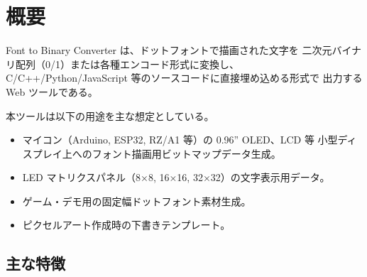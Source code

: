 \section{概要}

Font to Binary Converter は、ドットフォントで描画された文字を
二次元バイナリ配列（0/1）または各種エンコード形式に変換し、
C/C++/Python/JavaScript 等のソースコードに直接埋め込める形式で
出力する Web ツールである。

本ツールは以下の用途を主な想定としている。

\begin{itemize}[leftmargin=*,itemsep=2pt]
  \item マイコン（Arduino, ESP32, RZ/A1 等）の 0.96'' OLED、LCD 等
        小型ディスプレイ上へのフォント描画用ビットマップデータ生成。
  \item LED マトリクスパネル（8×8, 16×16, 32×32）の文字表示用データ。
  \item ゲーム・デモ用の固定幅ドットフォント素材生成。
  \item ピクセルアート作成時の下書きテンプレート。
\end{itemize}

\subsection{主な特徴}

